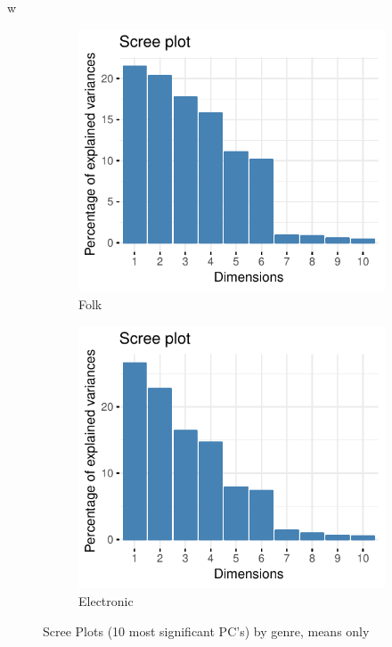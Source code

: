 w\documentclass[11pt, oneside]{article}
\begin{document}
\begin{figure}[h]
    \begin{subfigure}[b]{0.5\textwidth}
        \includegraphics[width=\textwidth]{folk_scree2.pdf} 
        \caption{Folk}
    \end{subfigure}%
    \begin{subfigure}[b]{0.5\textwidth}
        \includegraphics[width=\textwidth]{elec_scree2.pdf} 
        \caption{Electronic}
    \end{subfigure}%
\caption{Scree Plots (10 most significant PC's) by genre, means only}
\label{fig:scree2}
\end{figure}
\end{document}
